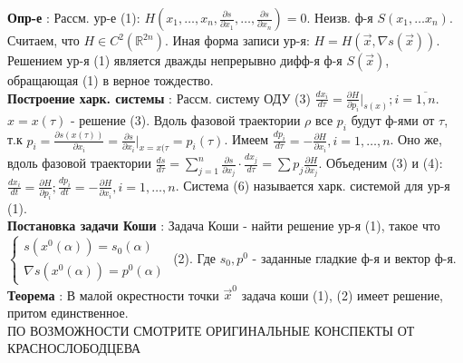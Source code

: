\documentclass[unicode, 8pt, a4paper,oneside, landscape]{article}
\begin{document}
\begin{multicols}{4}
{\bf Опр-е} : Рассм. ур-е (1): $H(x_1, \ldots, x_n, \frac{\partial s}{\partial x_1}, \ldots, \frac{\partial s}{\partial x_n}) = 0$. Неизв. ф-я $S(x_1, \ldots x_n)$. Считаем, что $H \in C^2(\mathbb{R}^{2n})$. Иная форма записи ур-я: $H = H(\vec{x}, \nabla s(\vec{x}))$. Решением ур-я (1) является дважды непрерывно дифф-я ф-я $S(\vec{x})$, обращающая (1) в верное тождество.\\
{\bf Построение харк. системы} : Рассм. систему ОДУ (3) $\frac{dx_i}{d\tau} = \frac{\partial H}{\partial p_i}|_{s(x)}; i = \overline{1,n}$. $x = x(\tau)$ - решение (3). Вдоль фазовой траектории $\rho$ все $p_i$ будут ф-ями от $\tau$, т.к $p_i = \frac{\partial s(x(\tau))}{\partial x_i} = \frac{\partial s}{\partial x_i}|_{x=x(\tau} = p_i(\tau)$. Имеем $\frac{dp_i}{d\tau} = -\frac{\partial H}{\partial x_i}, i = 1, \ldots, n$. Оно же, вдоль фазовой траектории $\frac{ds}{d\tau} = \sum_{j=1}^n \frac{\partial s}{\partial x_j} \cdot \frac{dx_j}{d\tau} = \sum p_j\frac{\partial H}{\partial x_j}$. Объеденим (3) и (4): $\frac{dx_i}{dt} = \frac{\partial H}{\partial p_i}; \frac{dp_i}{dt} = -\frac{\partial H}{\partial x_i}, i = 1,\ldots,n$. Система (6) называется харк. системой для ур-я (1).\\
{\bf Постановка задачи Коши} : Задача Коши - найти решение ур-я (1), такое что $\begin{cases} s(x^0(\alpha)) = s_0(\alpha) \\ \nabla s(x^0(\alpha)) = p^0(\alpha) \end{cases}$ (2). Где $s_0, p^0$ - заданные гладкие ф-я и вектор ф-я.\\
{\bf Теорема} : В малой окрестности точки $\vec{x}^0$ задача коши (1), (2) имеет решение, притом единственное.\\ ПО ВОЗМОЖНОСТИ СМОТРИТЕ ОРИГИНАЛЬНЫЕ КОНСПЕКТЫ ОТ КРАСНОСЛОБОДЦЕВА\\














\end{multicols}	
\end{document}
